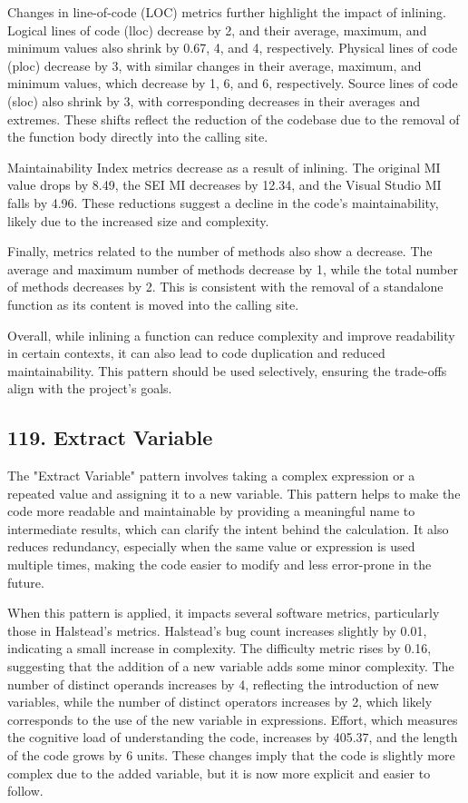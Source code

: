 Changes in line-of-code (LOC) metrics further highlight the impact of inlining. Logical lines of code (lloc) decrease by 2, and their average, maximum, and minimum values also shrink by 0.67, 4, and 4, respectively. Physical lines of code (ploc) decrease by 3, with similar changes in their average, maximum, and minimum values, which decrease by 1, 6, and 6, respectively. Source lines of code (sloc) also shrink by 3, with corresponding decreases in their averages and extremes. These shifts reflect the reduction of the codebase due to the removal of the function body directly into the calling site.

Maintainability Index metrics decrease as a result of inlining. The original MI value drops by 8.49, the SEI MI decreases by 12.34, and the Visual Studio MI falls by 4.96. These reductions suggest a decline in the code's maintainability, likely due to the increased size and complexity.

Finally, metrics related to the number of methods also show a decrease. The average and maximum number of methods decrease by 1, while the total number of methods decreases by 2. This is consistent with the removal of a standalone function as its content is moved into the calling site.

Overall, while inlining a function can reduce complexity and improve readability in certain contexts, it can also lead to code duplication and reduced maintainability. This pattern should be used selectively, ensuring the trade-offs align with the project's goals.

\subsection{119. Extract Variable}

The "Extract Variable" pattern involves taking a complex expression or a repeated value and assigning it to a new variable. This pattern helps to make the code more readable and maintainable by providing a meaningful name to intermediate results, which can clarify the intent behind the calculation. It also reduces redundancy, especially when the same value or expression is used multiple times, making the code easier to modify and less error-prone in the future.

When this pattern is applied, it impacts several software metrics, particularly those in Halstead's metrics. Halstead's bug count increases slightly by 0.01, indicating a small increase in complexity. The difficulty metric rises by 0.16, suggesting that the addition of a new variable adds some minor complexity. The number of distinct operands increases by 4, reflecting the introduction of new variables, while the number of distinct operators increases by 2, which likely corresponds to the use of the new variable in expressions. Effort, which measures the cognitive load of understanding the code, increases by 405.37, and the length of the code grows by 6 units. These changes imply that the code is slightly more complex due to the added variable, but it is now more explicit and easier to follow.

